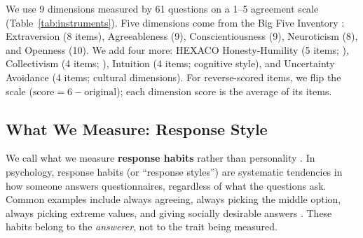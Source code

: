 \documentclass[11pt]{article}
\begin{document}
We use 9 dimensions measured by 61 questions on a 1--5 agreement scale (Table~\ref{tab:instruments}).
Five dimensions come from the Big Five Inventory \citep{john1999bigfive, mccrae1992five, soto2017bfi2}: Extraversion (8 items), Agreeableness (9), Conscientiousness (9), Neuroticism (8), and Openness (10).
We add four more: HEXACO Honesty-Humility (5 items; \citealp{lee2004hexaco}), Collectivism (4 items; \citealp{schwartz1992universals}), Intuition (4 items; cognitive style), and Uncertainty Avoidance (4 items; cultural dimensions).
For reverse-scored items, we flip the scale ($\text{score} = 6 - \text{original}$); each dimension score is the average of its items.

\begin{table}[!htb]
\centering
\footnotesize
\caption{Psychometric instruments: 9 dimensions, 61 Likert items (1--5 scale).}
\label{tab:instruments}
\end{table}

\subsection{What We Measure: Response Style}
\label{sec:response_style}

We call what we measure \textbf{response habits} rather than personality \citep{paulhus1991response, rammstedt2000response}.
In psychology, response habits (or ``response styles'') are systematic tendencies in how someone answers questionnaires, regardless of what the questions ask.
Common examples include always agreeing, always picking the middle option, always picking extreme values, and giving socially desirable answers \citep{baumgartner2007modeling}.
These habits belong to the \emph{answerer}, not to the trait being measured.
\end{document}
